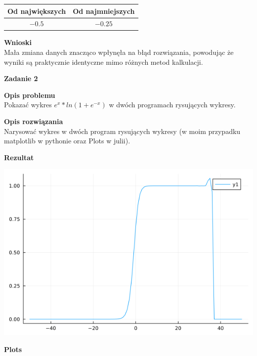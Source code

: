 \documentclass{article}
\begin{document}
\begin{center}
	\begin{tabular}{|c|c|}
		\hline
		\textbf{Od największych} & \textbf{Od najmniejszych} \\
		\hline
		$-0.5$                   & $-0.25$                   \\
		\hline
	\end{tabular}
\end{center}

\noindent \textbf{Wnioski} \\
Mała zmiana danych znacząco wpłynęła na błąd rozwiązania, powodując że wyniki
są praktycznie identyczne mimo różnych metod kalkulacji.

\noindent \textbf{\large Zadanie 2}

\noindent \textbf{Opis problemu} \\
Pokazać wykres $e^x*ln(1 + e^{-x})$ w dwóch programach rysujących wykresy.

\noindent \textbf{Opis rozwiązania} \\
Narysować wykres w dwóch program rysujących wykresy (w moim przypadku
matplotlib w pythonie oraz Plots w julii).

\pagebreak

\noindent \textbf{Rezultat}

\begin{center}
	\includegraphics[scale=0.5]{plot.png}

	\textbf{Plots}
\end{center}
\end{document}
